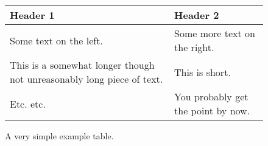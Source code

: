 \usepackage{booktabs}

\begingroup %
\setlength{\tabcolsep}{9pt} %
\renewcommand{\arraystretch}{1.5} %
\begin{figure}
\begin{tabular}{p{} p{}} \toprule
	\textbf{Header 1} & \textbf{Header 2} \\
	\midrule
	Some text on the left. & Some more text on the right. \\
	This is a somewhat longer though not unreasonably long piece of text. & This is short. \\
	Etc. etc. & You probably get the point by now. \\
		\bottomrule
\end{tabular}
\caption{A very simple example table.}
\label{fig:table}
\end{figure}
\endgroup
